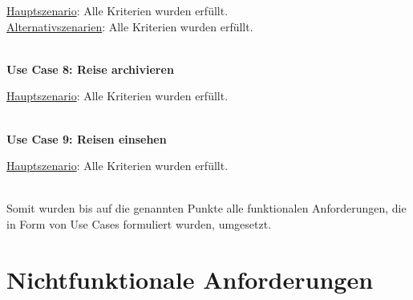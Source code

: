 \begin{addmargin}{10pt}
\underline{Hauptszenario}: Alle Kriterien wurden erfüllt.\\
\underline{Alternativszenarien}: Alle Kriterien wurden erfüllt.\\
\end{addmargin}
\\
\textbf{Use Case 8: Reise archivieren}\\

\begin{addmargin}{10pt}
\underline{Hauptszenario}: Alle Kriterien wurden erfüllt.\\
\end{addmargin}
\\
\textbf{Use Case 9: Reisen einsehen}\\

\begin{addmargin}{10pt}
\underline{Hauptszenario}: Alle Kriterien wurden erfüllt.\\
\end{addmargin}
\\
Somit wurden bis auf die genannten Punkte alle funktionalen Anforderungen, die in Form von Use Cases formuliert wurden, umgesetzt.


\section{Nichtfunktionale Anforderungen}





